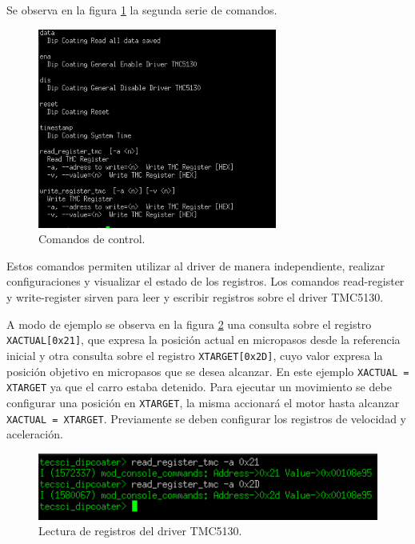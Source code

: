 Se observa en la figura \ref{fig:consola_comandos} la segunda serie de comandos. 

\begin{figure}[h!]
	\centering
	\includegraphics[width=0.7\textwidth]{./Figures/consola_3.png}
	\caption{Comandos de control.}
	\label{fig:consola_comandos}
\end{figure}

Estos comandos permiten utilizar al driver de manera independiente, realizar configuraciones y visualizar el estado de los registros.
Los comandos read-register y write-register sirven para leer y escribir registros sobre el driver TMC5130.

A modo de ejemplo se observa en la figura \ref{fig:comando_lectura} una consulta sobre el registro \texttt{XACTUAL[0x21]}, que expresa la posición actual en micropasos desde la referencia inicial y otra consulta sobre el registro \texttt{XTARGET[0x2D]}, cuyo valor expresa la posición objetivo en micropasos que se desea alcanzar. En este ejemplo \texttt{XACTUAL = XTARGET} ya que el carro estaba detenido. Para ejecutar un movimiento se debe configurar una posición en \texttt{XTARGET}, la misma accionará el motor hasta alcanzar \texttt{XACTUAL = XTARGET}. Previamente se deben configurar los registros de velocidad y aceleración.


\begin{figure}[h!]
	\centering
	\includegraphics[width=1\textwidth]{./Figures/consola_6.png}
	\caption{Lectura de registros del driver TMC5130.}
	\label{fig:comando_lectura}
\end{figure}


